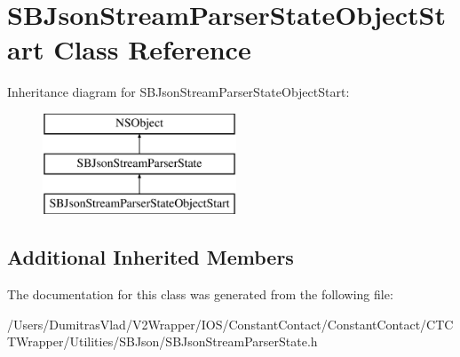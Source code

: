 \hypertarget{interface_s_b_json_stream_parser_state_object_start}{\section{S\-B\-Json\-Stream\-Parser\-State\-Object\-Start Class Reference}
\label{interface_s_b_json_stream_parser_state_object_start}
}
Inheritance diagram for S\-B\-Json\-Stream\-Parser\-State\-Object\-Start\-:\begin{figure}[H]
\begin{center}
\leavevmode
\includegraphics[height=3.000000cm]{interface_s_b_json_stream_parser_state_object_start}
\end{center}
\end{figure}
\subsection*{Additional Inherited Members}


The documentation for this class was generated from the following file\-:\begin{DoxyCompactItemize}
\item 
/\-Users/\-Dumitras\-Vlad/\-V2\-Wrapper/\-I\-O\-S/\-Constant\-Contact/\-Constant\-Contact/\-C\-T\-C\-T\-Wrapper/\-Utilities/\-S\-B\-Json/S\-B\-Json\-Stream\-Parser\-State.\-h\end{DoxyCompactItemize}
